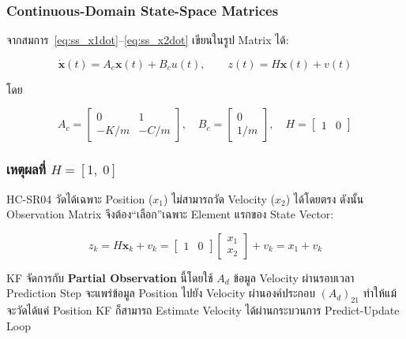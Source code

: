 \subsubsection{Continuous-Domain State-Space Matrices}

จากสมการ~\eqref{eq:ss_x1dot}--\eqref{eq:ss_x2dot} เขียนในรูป Matrix ได้:

\begin{equation}
    \dot{\mathbf{x}}(t) = A_c \mathbf{x}(t) + B_c u(t), \qquad
    z(t) = H\mathbf{x}(t) + v(t)
    \label{eq:ss_compact}
\end{equation}

โดย

\begin{equation}
    A_c = \begin{bmatrix} 0 & 1 \\ -K/m & -C/m \end{bmatrix}, \quad
    B_c = \begin{bmatrix} 0 \\ 1/m \end{bmatrix}, \quad
    H   = \begin{bmatrix} 1 & 0 \end{bmatrix}
    \label{eq:cont_matrices}
\end{equation}

\subsubsection{เหตุผลที่ $H = [1,\; 0]$}

HC-SR04 วัดได้เฉพาะ Position ($x_1$) ไม่สามารถวัด Velocity ($x_2$) ได้โดยตรง
ดังนั้น Observation Matrix จึงต้อง``เลือก''เฉพาะ Element แรกของ State Vector:

\begin{equation}
    z_k = H\mathbf{x}_k + v_k = \begin{bmatrix}1 & 0\end{bmatrix}
          \begin{bmatrix}x_1 \\ x_2\end{bmatrix} + v_k = x_1 + v_k
    \label{eq:obs_equation}
\end{equation}

KF จัดการกับ \textbf{Partial Observation} นี้โดยใช้ $A_d$ 
ข้อมูล Velocity ผ่านรอบเวลา Prediction Step จะแพร่ข้อมูล Position
ไปยัง Velocity ผ่านองค์ประกอบ $(A_d)_{21}$ ทำให้แม้จะวัดได้แค่ Position
KF ก็สามารถ Estimate Velocity ได้ผ่านกระบวนการ Predict-Update Loop

